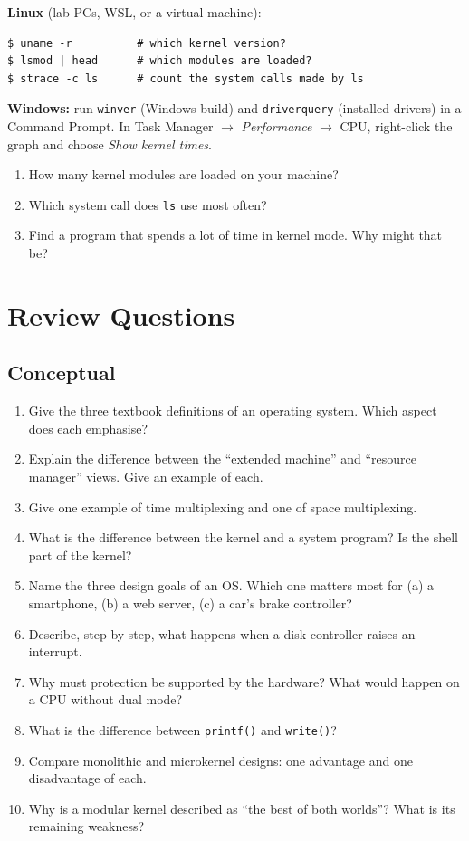 \documentclass[11pt,a4paper]{article}
\newcommand{\cmd}[1]{\texttt{#1}}
\begin{document}
\begin{tryit}
\textbf{Linux} (lab PCs, WSL, or a virtual machine):
\begin{lstlisting}[style=term]
$ uname -r          # which kernel version?
$ lsmod | head      # which modules are loaded?
$ strace -c ls      # count the system calls made by ls
\end{lstlisting}
\textbf{Windows:} run \cmd{winver} (Windows build) and \cmd{driverquery} (installed drivers) in a Command Prompt. In Task Manager $\to$ \emph{Performance} $\to$ CPU, right-click the graph and choose \emph{Show kernel times}.
\begin{enumerate}[leftmargin=1.4em]
  \item How many kernel modules are loaded on your machine?
  \item Which system call does \cmd{ls} use most often?
  \item Find a program that spends a lot of time in kernel mode. Why might that be?
\end{enumerate}
\end{tryit}

\section{Review Questions}

\subsection*{Conceptual}
\begin{enumerate}[leftmargin=1.6em]
  \item Give the three textbook definitions of an operating system. Which aspect does each emphasise?
  \item Explain the difference between the ``extended machine'' and ``resource manager'' views. Give an example of each.
  \item Give one example of time multiplexing and one of space multiplexing.
  \item What is the difference between the kernel and a system program? Is the shell part of the kernel?
  \item Name the three design goals of an OS. Which one matters most for (a) a smartphone, (b) a web server, (c) a car's brake controller?
  \item Describe, step by step, what happens when a disk controller raises an interrupt.
  \item Why must protection be supported by the hardware? What would happen on a CPU without dual mode?
  \item What is the difference between \cmd{printf()} and \cmd{write()}?
  \item Compare monolithic and microkernel designs: one advantage and one disadvantage of each.
  \item Why is a modular kernel described as ``the best of both worlds''? What is its remaining weakness?
\end{enumerate}
\end{document}
